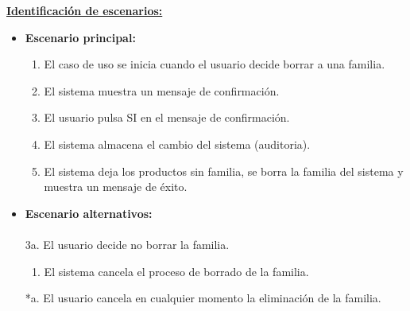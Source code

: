 \underline{\textbf{Identificación de escenarios:}}
\begin{itemize}\renewcommand{\labelitemi}{$\circ$}
 \item \textbf{Escenario principal:}
         \begin{enumerate}
          \item El caso de uso se inicia cuando el usuario decide borrar a una familia.
          \item El sistema muestra un mensaje de confirmación.
          \item El usuario pulsa SI en el mensaje de confirmación.
 	  \item El sistema almacena el cambio del sistema (auditoria).
	   \item El sistema deja los productos sin familia, se borra la familia del sistema y muestra un mensaje de éxito.
         \end{enumerate}
  \item \textbf{Escenario alternativos:}\\\\
	3a. El usuario decide no borrar la familia.
		\begin{enumerate}
		 \item El sistema cancela el proceso de borrado de la familia.
		\end{enumerate}
          *a. El usuario cancela en cualquier momento la eliminación de la familia.
\end{itemize}

